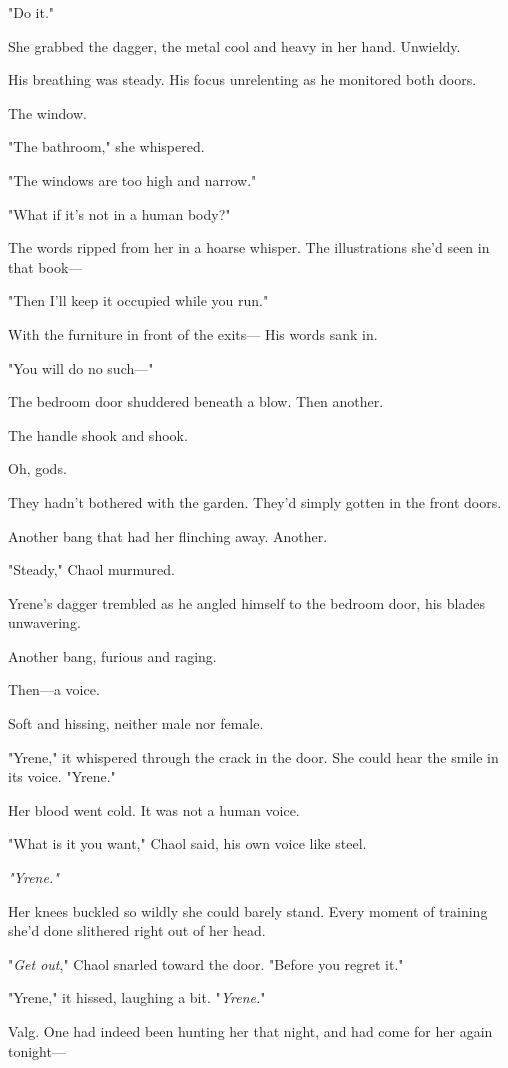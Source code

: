 "Do it."

She grabbed the dagger, the metal cool and heavy in her hand. Unwieldy.

His breathing was steady. His focus unrelenting as he monitored both doors.

The window.

"The bathroom," she whispered.

"The windows are too high and narrow."

"What if it's not in a human body?"

The words ripped from her in a hoarse whisper. The illustrations she'd seen in that book---

"Then I'll keep it occupied while you run."

With the furniture in front of the exits--- His words sank in.

"You will do no such---"

The bedroom door shuddered beneath a blow. Then another.

The handle shook and shook.

Oh, gods.

They hadn't bothered with the garden. They'd simply gotten in the front doors.

Another bang that had her flinching away. Another.

"Steady," Chaol murmured.

Yrene's dagger trembled as he angled himself to the bedroom door, his blades unwavering.

Another bang, furious and raging.

Then---a voice.

Soft and hissing, neither male nor female.

"Yrene," it whispered through the crack in the door. She could hear the smile in its voice. "Yrene."

Her blood went cold. It was not a human voice.

"What is it you want," Chaol said, his own voice like steel.

\emph{"Yrene."}

Her knees buckled so wildly she could barely stand. Every moment of training she'd done slithered right out of her head.

"\emph{Get out}," Chaol snarled toward the door. "Before you regret it."

"Yrene," it hissed, laughing a bit. "\emph{Yrene.}"

Valg. One had indeed been hunting her that night, and had come for her again tonight---

